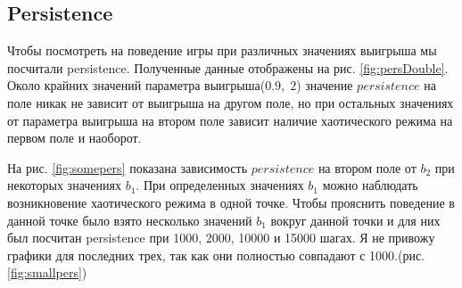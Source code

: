 \documentclass[12pt]{article}
\begin{document}
\subsection{Persistence}
    Чтобы посмотреть на поведение игры при различных значениях выигрыша мы посчитали persistence. Полученные данные отображены на рис. \ref{fig:persDouble}.
    Около крайних значений параметра выигрыша($0.9,\;2$) значение $persistence$ на поле никак не зависит от выигрыша на другом поле, но при остальных значениях от параметра выигрыша на втором поле зависит наличие хаотического режима на первом поле и наоборот.
    
    На рис. \ref{fig:somepers} показана зависимость $persistence$ на втором поле от $b_2$ при некоторых значениях $b_1$. При определенных значениях $b_1$ можно наблюдать возникновение хаотического режима в одной точке.
    Чтобы прояснить поведение в данной точке было взято несколько значений $b_1$ вокруг данной точки и для них был посчитан persistence при 1000, 2000, 10000 и 15000 шагах. Я не привожу графики для последних трех, так как они полностью совпадают с 1000.(рис. \ref{fig:smallpers})
    
\end{document}

